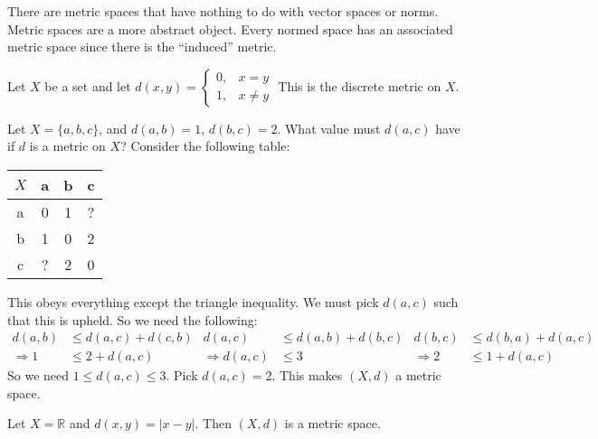         There are metric spaces that have nothing to do
        with vector spaces or norms. Metric spaces are
        a more abstract object. Every normed space
        has an associated metric space since there
        is the ``induced'' metric.
        \begin{example}
            Let $X$ be a set and let
            $d(x,y)=\begin{cases}%
                        0,&x=y\\%
                        1,&{x}\ne{y}%
                    \end{cases}$
            This is the discrete metric on $X$.
        \end{example}
        \begin{example}
            Let $X=\{a,b,c\}$, and
            $d(a,b)=1$, $d(b,c)=2$. What value
            must $d(a,c)$ have if $d$ is a metric on $X$?
            Consider the following table:
            \begin{table}[H]
                \captionsetup{type=table}
                \centering
                \begin{tabular}{|c|c|c|c|}
                    \hline
                    $X$&a&b&c\\
                    \hline
                    a&0&1&?\\
                    \hline
                    b&1&0&2\\
                    \hline
                    c&?&2&0\\
                    \hline
                \end{tabular}
            \end{table}
            This obeys everything except the triangle
            inequality. We must pick $d(a,c)$
            such that this is upheld.
            So we need the following:
            \begin{align*}
                d(a,b)&\leq{d(a,c)+d(c,b)}&
                d(a,c)&\leq{d(a,b)+d(b,c)}&
                d(b,c)&\leq{d(b,a)+d(a,c)}\\
                \Rightarrow{1}&\leq{2+d(a,c)}&
                \Rightarrow{d(a,c)}&\leq{3}&
                \Rightarrow{2}&\leq{1+d(a,c)}
            \end{align*}
            So we need $1\leq{d(a,c)}\leq{3}$.
            Pick $d(a,c)=2$.
            This makes $(X,d)$ a metric space.
        \end{example}
        \begin{example}
            Let $X=\mathbb{R}$ and $d(x,y)=|x-y|$.
            Then $(X,d)$ is a metric space.
        \end{example}
